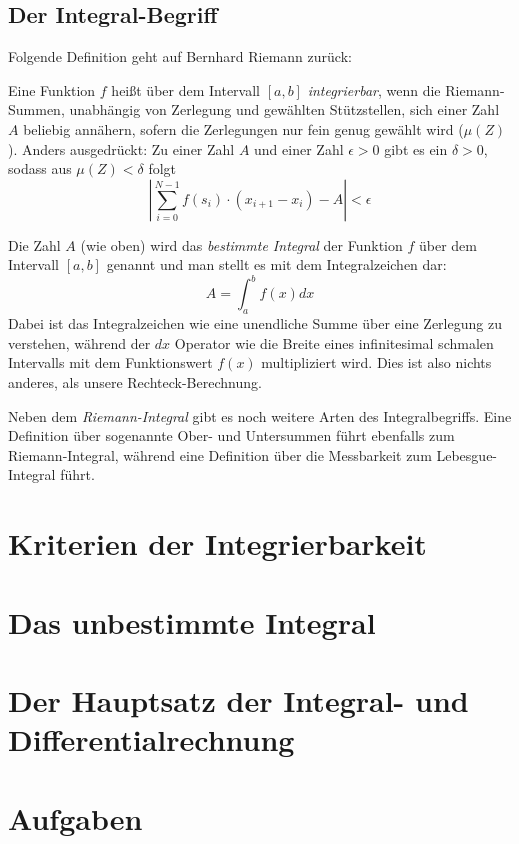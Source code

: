\subsection{Der Integral-Begriff}

Folgende Definition geht auf Bernhard Riemann zurück:

\begin{definition}
Eine Funktion $f$ heißt über dem Intervall $[a,b]$ \emph{integrierbar}, wenn die Riemann-Summen, unabhängig von Zerlegung und gewählten Stützstellen, sich einer Zahl $A$ beliebig annähern, sofern die Zerlegungen nur fein genug gewählt wird ($\mu(Z)$). Anders ausgedrückt: Zu einer Zahl $A$ und einer Zahl $\epsilon >0$ gibt es ein $\delta >0$, sodass aus $\mu(Z)<\delta$ folgt
\begin{equation}
\left| \sum_{i=0}^{N-1} f(s_i)\cdot (x_{i+1}-x_i) -A \right| < \epsilon
\end{equation}
\end{definition}

\begin{definition}
Die Zahl $A$ (wie oben) wird das \emph{bestimmte Integral} der Funktion $f$ über dem Intervall $[a,b]$ genannt und man stellt es mit dem Integralzeichen dar:
\begin{equation}
A = \int_{a}^{b} f(x) dx
\end{equation}
Dabei ist das Integralzeichen wie eine unendliche Summe über eine Zerlegung zu verstehen, während der $dx$ Operator wie die Breite eines infinitesimal schmalen Intervalls mit dem Funktionswert $f(x)$ multipliziert wird. Dies ist also nichts anderes, als unsere Rechteck-Berechnung.
\end{definition}

Neben dem \emph{Riemann-Integral} gibt es noch weitere Arten des Integralbegriffs. Eine Definition über sogenannte Ober- und Untersummen führt ebenfalls zum Riemann-Integral, während eine Definition über die Messbarkeit zum Lebesgue-Integral führt.

\section{Kriterien der Integrierbarkeit}

\section{Das unbestimmte Integral}

\section{Der Hauptsatz der Integral- und Differentialrechnung}



\section{Aufgaben}